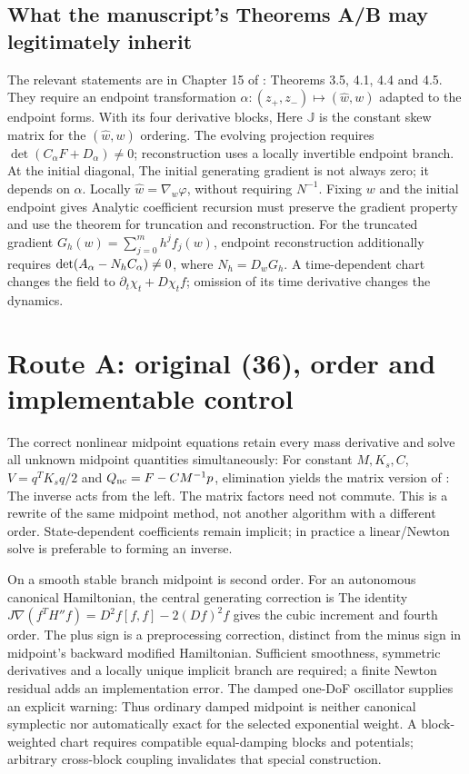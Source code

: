 \subsection{What the manuscript's Theorems A/B may legitimately inherit}
The relevant statements are in Chapter 15 of \citet{fengqin2010}: Theorems 3.5, 4.1, 4.4 and 4.5. They require an endpoint transformation $\alpha:(z_+,z_-)\mapsto(\widehat w,w)$ adapted to the endpoint forms. With its four derivative blocks,
\EqEndpoint
Here $\mathbb J$ is the constant skew matrix for the $(\widehat w,w)$ ordering. The evolving projection requires $\det(C_\alpha F+D_\alpha)\ne0$; reconstruction uses a locally invertible endpoint branch. At the initial diagonal,
\EqInitialGenerating
The initial generating gradient is not always zero; it depends on $\alpha$. Locally $\widehat w=\nabla_w\varphi$, without requiring $N^{-1}$. Fixing $w$ and the initial endpoint gives
\EqGeneratingTime
Analytic coefficient recursion must preserve the gradient property and use the theorem for truncation and reconstruction. For the truncated gradient $G_h(w)=\sum_{j=0}^{m}h^jf_j(w)$, endpoint reconstruction additionally requires $\det(A_\alpha-N_hC_\alpha)\ne0$, where $N_h=D_wG_h$. A time-dependent chart changes the field to $\partial_t\chi_t+D\chi_t f$; omission of its time derivative changes the dynamics.

\PaperPage
\section{Route A: original (36), order and implementable control}
The correct nonlinear midpoint equations retain every mass derivative and solve all unknown midpoint quantities simultaneously:
\EqMidpoint
For constant $M,K_s,C$, $V=q^TK_sq/2$ and $Q_{\rm nc}=F-CM^{-1}p$, elimination yields the matrix version of :
\EqOriginalThirtySix
The inverse acts from the left. The matrix factors need not commute. This is a rewrite of the same midpoint method, not another algorithm with a different order. State-dependent coefficients remain implicit; in practice a linear/Newton solve is preferable to forming an inverse.

On a smooth stable branch midpoint is second order. For an autonomous canonical Hamiltonian, the central generating correction is
\EqCentral
The identity $J\nabla(f^TH''f)=D^2f[f,f]-2(Df)^2f$ gives the cubic increment and fourth order. The plus sign is a preprocessing correction, distinct from the minus sign in midpoint's backward modified Hamiltonian. Sufficient smoothness, symmetric derivatives and a locally unique implicit branch are required; a finite Newton residual adds an implementation error. The damped one-DoF oscillator supplies an explicit warning:
\EqDampingCounterexample
Thus ordinary damped midpoint is neither canonical symplectic nor automatically exact for the selected exponential weight. A block-weighted chart requires compatible equal-damping blocks and potentials; arbitrary cross-block coupling invalidates that special construction.

